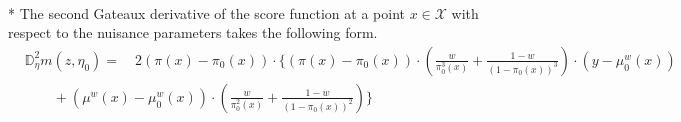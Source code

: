 \begin{boxD}
    \begin{lem}\label{lem:score_2gateaux_derivative}\mbox{}\\*
        The second Gateaux derivative of the score function at a point $x \in \mathcal{X}$ with respect to the nuisance parameters takes the following form.
        \begin{equation}
            \begin{aligned}
                & \mathbb{D}_{\eta}^{2} m(z, \eta_{0})
                = \quad 2\left(\pi(x) - \pi_{0}(x)\right) \cdot \Bigg\{
                \left(\pi(x) - \pi_{0}(x)\right) \cdot \left(\frac{w}{\pi_{0}^{3}(x)} + \frac{1-w}{\left(1-\pi_{0}(x)\right)^{3}}\right) \cdot \left(y - \mu_{0}^{w}(x)\right) \\
                & \quad \quad +  \left(\mu^{w}(x) - \mu_{0}^{w}(x)\right) \cdot \left(\frac{w}{\pi_{0}^{2}(x)} + \frac{1-w}{\left(1-\pi_{0}(x)\right)^{2}}\right)
            \Bigg\}
            \end{aligned}
        \end{equation}
    \end{lem}
\end{boxD}

